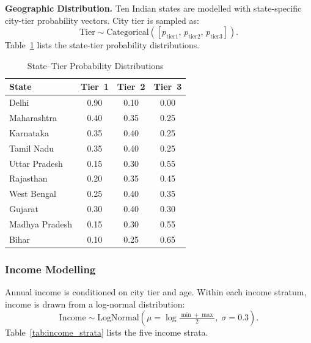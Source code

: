 \documentclass[10pt,journal,compsoc]{IEEEtran}
\begin{document}
\textbf{Geographic Distribution.}
Ten Indian states are modelled with state-specific city-tier probability vectors.
City tier is sampled as:
\begin{equation}
  \text{Tier} \sim \mathrm{Categorical}([p_{\text{tier1}},\,
                                          p_{\text{tier2}},\,
                                          p_{\text{tier3}}]).
  \label{eq:tier}
\end{equation}
Table~\ref{tab:state_tier} lists the state-tier probability distributions.

\begin{table}[!t]
\caption{State--Tier Probability Distributions}
\label{tab:state_tier}
\centering
\begin{tabular}{lccc}
\toprule
\textbf{State} & \textbf{Tier~1} & \textbf{Tier~2} & \textbf{Tier~3} \\
\midrule
Delhi          & 0.90 & 0.10 & 0.00 \\
Maharashtra    & 0.40 & 0.35 & 0.25 \\
Karnataka      & 0.35 & 0.40 & 0.25 \\
Tamil Nadu     & 0.35 & 0.40 & 0.25 \\
Uttar Pradesh  & 0.15 & 0.30 & 0.55 \\
Rajasthan      & 0.20 & 0.35 & 0.45 \\
West Bengal    & 0.25 & 0.40 & 0.35 \\
Gujarat        & 0.30 & 0.40 & 0.30 \\
Madhya Pradesh & 0.15 & 0.30 & 0.55 \\
Bihar          & 0.10 & 0.25 & 0.65 \\
\bottomrule
\end{tabular}
\end{table}

\subsubsection{Income Modelling}

Annual income is conditioned on city tier and age.
Within each income stratum, income is drawn from a log-normal distribution:
\begin{equation}
  \text{Income} \sim \mathrm{LogNormal}\!\left(\mu=\log\!\tfrac{\min+\max}{2},\;
                                               \sigma=0.3\right).
  \label{eq:income}
\end{equation}
Table~\ref{tab:income_strata} lists the five income strata.
\end{document}
